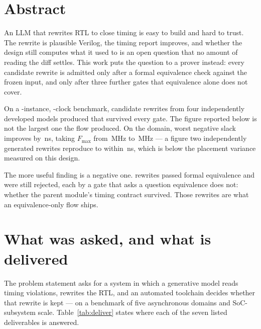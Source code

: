 \documentclass[11pt,a4paper]{article}
\begin{document}



\section*{Abstract}

An LLM that rewrites RTL to close timing is easy to build and hard to trust.
The rewrite is plausible Verilog, the timing report improves, and whether the
design still computes what it used to is an open question that no amount of
reading the diff settles. This work puts the question to a prover instead:
every candidate rewrite is admitted only after a formal equivalence check
against the frozen input, and only after three further gates that equivalence
alone does not cover.

On a \baselineinstances-instance, \baselineclocks-clock benchmark, \numcandidates{}
candidate rewrites from four independently developed models produced
\numaccepted{} that survived every gate. The figure reported below is not the
largest one the flow produced. On the \bestclock{} domain, worst negative slack
improves by \bestdelta\,ns, taking $F_{\max}$ from \bestfmaxfrom\,MHz to
\bestfmaxto\,MHz --- a figure two independently generated rewrites reproduce to
within \bestagreement\,ns, which is below the placement variance measured on
this design.

The more useful finding is a negative one. \numcontractkills{} rewrites passed
formal equivalence and were still rejected, each by a gate that asks a question
equivalence does not: whether the parent module's timing contract survived.
Those rewrites are what an equivalence-only flow ships.

\section{What was asked, and what is delivered}

The problem statement asks for a system in which a generative model reads
timing violations, rewrites the RTL, and an automated toolchain decides whether
that rewrite is kept --- on a benchmark of five asynchronous domains and
SoC-subsystem scale. Table~\ref{tab:deliver} states where each of the seven
listed deliverables is answered.
\end{document}
